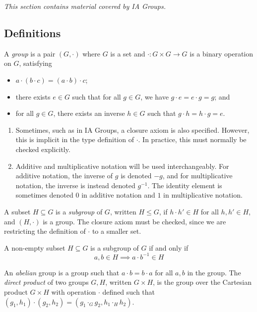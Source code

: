 \textit{This section contains material covered by IA Groups.}

\subsection{Definitions}
A \textit{group} is a pair \( (G, \cdot) \) where \( G \) is a set and \( \cdot \colon G \times G \to G \) is a binary operation on \( G \), satisfying
\begin{itemize}
	\item \( a \cdot (b \cdot c) = (a \cdot b) \cdot c \);
	\item there exists \( e \in G \) such that for all \( g \in G \), we have \( g \cdot e = e \cdot g = g \); and
	\item for all \( g \in G \), there exists an inverse \( h \in G \) such that \( g \cdot h = h \cdot g = e \).
\end{itemize}
\begin{remark}
	\begin{enumerate}
		\item Sometimes, such as in IA Groups, a closure axiom is also specified.
			However, this is implicit in the type definition of \( \cdot \).
			In practice, this must normally be checked explicitly.
		\item Additive and multiplicative notation will be used interchangeably.
			For additive notation, the inverse of \( g \) is denoted \( -g \), and for multiplicative notation, the inverse is instead denoted \( g^{-1} \).
			The identity element is sometimes denoted \( 0 \) in additive notation and \( 1 \) in multiplicative notation.
	\end{enumerate}
\end{remark}
A subset \( H \subseteq G \) is a \textit{subgroup} of \( G \), written \( H \leq G \), if \( h \cdot h' \in H \) for all \( h, h' \in H \), and \( (H, \cdot) \) is a group.
The closure axiom must be checked, since we are restricting the definition of \( \cdot \) to a smaller set.
\begin{remark}
	A non-empty subset \( H \subseteq G \) is a subgroup of \( G \) if and only if
	\[ a, b \in H \implies a \cdot b^{-1} \in H \]
\end{remark}
An \textit{abelian} group is a group such that \( a \cdot b = b \cdot a \) for all \( a, b \) in the group.
The \textit{direct product} of two groups \( G, H \), written \( G \times H \), is the group over the Cartesian product \( G \times H \) with operation \( \cdot \) defined such that \( (g_1, h_1) \cdot (g_2, h_2) = (g_1 \cdot_G g_2, h_1 \cdot_H h_2) \).

